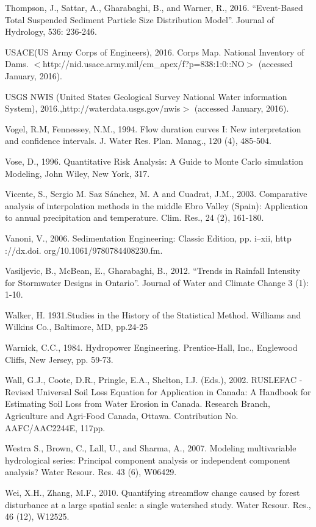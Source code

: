 \begin{hangingpar}{2em}
Thompson, J., Sattar, A., Gharabaghi, B., and Warner, R., 2016.  ``Event-Based Total Suspended Sediment Particle Size Distribution Model''.  Journal of Hydrology, 536: 236-246.

USACE(US Army Corps of Engineers), 2016. Corps Map. National Inventory of Dams. $<$http://nid.usace.army.mil/cm\_apex/f?p=838:1:0::NO$>$ (accessed January, 2016).

USGS NWIS (United States Geological Survey National Water information System), 2016.,http://waterdata.usgs.gov/nwis$>$ (accessed January, 2016).

Vogel, R.M, Fennessey, N.M., 1994. Flow duration curves I: New interpretation and confidence intervals. J. Water Res. Plan. Manag., 120 (4), 485-504.

Vose, D., 1996. Quantitative Risk Analysis: A Guide to Monte Carlo simulation Modeling, John Wiley, New York, 317.

Vicente, S., Sergio M. Saz Sánchez, M. A and Cuadrat, J.M., 2003. Comparative analysis of interpolation methods in the middle Ebro Valley (Spain): Application to annual precipitation and temperature. Clim. Res., 24 (2), 161-180.

Vanoni, V., 2006. Sedimentation Engineering: Classic Edition, pp. i–xii, http ://dx.doi. org/10.1061/9780784408230.fm.

Vasiljevic, B., McBean, E., Gharabaghi, B., 2012. ``Trends in Rainfall Intensity for Stormwater Designs in Ontario''.   Journal of Water and Climate Change 3 (1): 1-10.

Walker, H. 1931.Studies in the History of the Statistical Method. Williams and Wilkins Co., Baltimore, MD, pp.24-25

Warnick, C.C., 1984. Hydropower Engineering. Prentice-Hall, Inc., Englewood Cliffs, New Jersey, pp. 59-73.

Wall, G.J., Coote, D.R., Pringle, E.A., Shelton, I.J. (Eds.), 2002. RUSLEFAC - Revised Universal Soil Loss Equation for Application in Canada: A Handbook for Estimating Soil Loss from Water Erosion in Canada. Research Branch, Agriculture and Agri-Food Canada, Ottawa. Contribution No. AAFC/AAC2244E, 117pp.

Westra S., Brown, C., Lall, U., and Sharma, A., 2007.  Modeling multivariable hydrological series: Principal component analysis or independent component analysis? Water Resour. Res. 43 (6), W06429.

Wei, X.H., Zhang, M.F., 2010. Quantifying streamflow change caused by forest disturbance at a large spatial scale: a single watershed study. Water Resour. Res., 46 (12), W12525.


\end{hangingpar}
